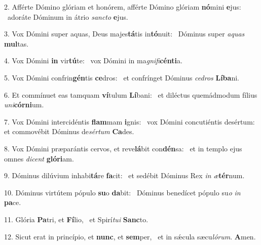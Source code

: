 2. Afférte Dómino glóriam et honórem, afférte Dómino glóriam \textbf{nó}mini \textbf{e}jus: \ast\  adoráte Dóminum in átrio \textit{sanc}\textit{to} \textbf{e}jus.\

3. Vox Dómini super aquas, Deus majes\textbf{tá}tis in\textbf{tó}nuit: \ast\  Dóminus super \textit{a}\textit{quas} \textbf{mul}tas.\

4. Vox Dómini \textbf{in} vir\textbf{tú}te: \ast\  vox Dómini in ma\textit{gni}\textit{fi}\textbf{cén}\textbf{ti}a.\

5. Vox Dómini confrin\textbf{gén}tis \textbf{ce}dros: \ast\  et confrínget Dóminus \textit{ce}\textit{dros} \textbf{Lí}\textbf{ba}ni.\

6. Et commínuet eas tamquam \textbf{ví}tulum \textbf{Lí}bani: \ast\  et diléctus quemádmodum fílius \textit{u}\textit{ni}\textbf{cór}\textbf{ni}um.\

7. Vox Dómini intercidéntis \textbf{flam}mam \textbf{i}gnis: \ast\  vox Dómini concutiéntis desértum: et commovébit Dóminus de\textit{sér}\textit{tum} \textbf{Ca}des.\

8. Vox Dómini præparántis cervos, et reve\textbf{lá}bit con\textbf{dén}sa: \ast\  et in templo ejus omnes \textit{di}\textit{cent} \textbf{gló}\textbf{ri}am.\

9. Dóminus dilúvium inhabi\textbf{tá}re \textbf{fa}cit: \ast\  et sedébit Dóminus Rex \textit{in} \textit{æ}\textbf{tér}num.\

10. Dóminus virtútem pópulo \textbf{su}o \textbf{da}bit: \ast\  Dóminus benedícet pópulo su\textit{o} \textit{in} \textbf{pa}ce.\

11. Glória \textbf{Pa}tri, et \textbf{Fí}lio, \ast\  et Spirí\textit{tu}\textit{i} \textbf{Sanc}to.\

12. Sicut erat in princípio, et \textbf{nunc}, et \textbf{sem}per, \ast\  et in sǽcula sæcu\textit{ló}\textit{rum}. \textbf{A}men.\

